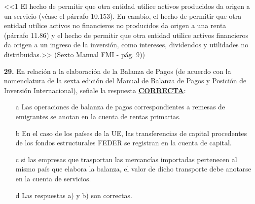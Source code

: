\documentclass{nuevotema}
\begin{document}
\conceptos

<<1 El hecho de permitir que otra entidad utilice activos producidos da origen a un servicio (véase el párrafo 10.153). En cambio, el hecho de permitir que otra entidad utilice activos no financieros no producidos da origen a una renta (párrafo 11.86) y el hecho de permitir que otra entidad utilice activos financieros da origen a un ingreso de la inversión, como intereses, dividendos y utilidades no distribuidas.>> (Sexto Manual FMI - pág. 9))

\preguntas



\textbf{29.} En relación a la elaboración de la Balanza de Pagos (de acuerdo con la nomenclatura de la sexta edición del Manual de Balanza de Pagos y Posición de Inversión Internacional), señale la respuesta \textbf{\underline{CORRECTA}}:

\begin{itemize}
	\item[a] Las operaciones de balanza de pagos correspondientes a remesas de emigrantes se anotan en la cuenta de rentas primarias.
	\item[b] En el caso de los países de la UE, las transferencias de capital procedentes de los fondos estructurales FEDER se registran en la cuenta de capital.
	\item[c] si las empresas que trasportan las mercancías importadas pertenecen al mismo país que elabora la balanza, el valor de dicho transporte debe anotarse en la cuenta de servicios.
	\item[d] Las respuestas a) y b) son correctas.
\end{itemize}
\end{document}
